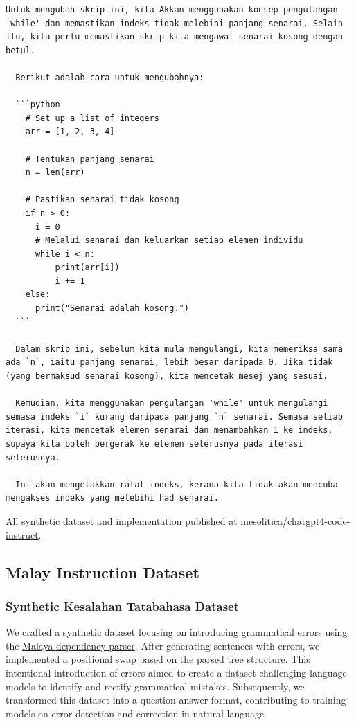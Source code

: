 \documentclass{article}
\begin{document}
\begin{lstlisting}[breaklines=true]
  Untuk mengubah skrip ini, kita Akkan menggunakan konsep pengulangan 'while' dan memastikan indeks tidak melebihi panjang senarai. Selain itu, kita perlu memastikan skrip kita mengawal senarai kosong dengan betul.

  Berikut adalah cara untuk mengubahnya:

  ```python
    # Set up a list of integers
    arr = [1, 2, 3, 4]

    # Tentukan panjang senarai
    n = len(arr)

    # Pastikan senarai tidak kosong
    if n > 0:
      i = 0
      # Melalui senarai dan keluarkan setiap elemen individu
      while i < n:
          print(arr[i])
          i += 1
    else:
      print("Senarai adalah kosong.")
  ```

  Dalam skrip ini, sebelum kita mula mengulangi, kita memeriksa sama ada `n`, iaitu panjang senarai, lebih besar daripada 0. Jika tidak (yang bermaksud senarai kosong), kita mencetak mesej yang sesuai.

  Kemudian, kita menggunakan pengulangan 'while' untuk mengulangi semasa indeks `i` kurang daripada panjang `n` senarai. Semasa setiap iterasi, kita mencetak elemen senarai dan menambahkan 1 ke indeks, supaya kita boleh bergerak ke elemen seterusnya pada iterasi seterusnya.

  Ini akan mengelakkan ralat indeks, kerana kita tidak akan mencuba mengakses indeks yang melebihi had senarai.
\end{lstlisting}

All synthetic dataset and implementation published at \href{https://huggingface.co/datasets/mesolitica/chatgpt4-code-instruct}{mesolitica/chatgpt4-code-instruct}.

\subsection{Malay Instruction Dataset}

\subsubsection{Synthetic Kesalahan Tatabahasa Dataset}

We crafted a synthetic dataset focusing on introducing grammatical errors using the \href{https://malaya.readthedocs.io/en/stable/load-dependency.html}{Malaya dependency parser}. After generating sentences with errors, we implemented a positional swap based on the parsed tree structure. This intentional introduction of errors aimed to create a dataset challenging language models to identify and rectify grammatical mistakes. Subsequently, we transformed this dataset into a question-answer format, contributing to training models on error detection and correction in natural language.
\end{document}
